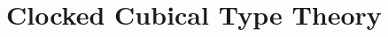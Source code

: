 \documentclass[a4paper,UKenglish,numberwithinsect,cleveref,thm-restate]{lipics-v2021}
\numberwithin{equation}{section}
\theoremstyle{plain}
\begin{document}
%
%  



\appendix

\section{Clocked Cubical Type Theory}

%
%
%
\end{document}
